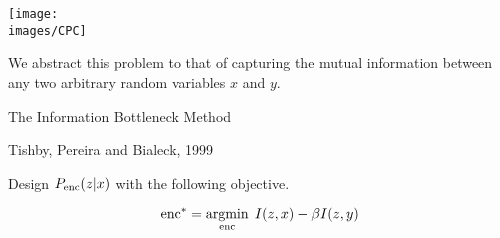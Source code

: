 {
\centerline{\texttt{[image: \\images/CPC]}}

\vfill
We abstract this problem to that of capturing the mutual information between any two arbitrary random variables $x$ and $y$.


\centerline{The Information Bottleneck Method}
\centerline{Tishby, Pereira and Bialeck, 1999}

\vfill
Design $P_{\mathrm{enc}}(z|x)$ with the following objective.

\vfill
$$\mathrm{enc}^* = \operatorname*{argmin}_{\mathrm{enc}}\;I(z,x) - \beta I(z,y)$$


}


